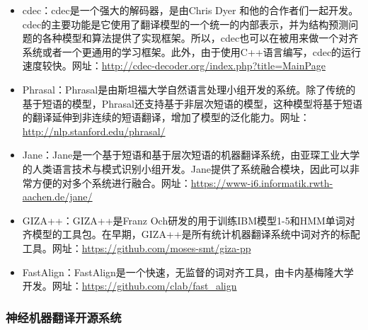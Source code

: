 \begin{itemize}
\vspace{0.5em}
\item cdec：cdec\cite{dyer2010cdec}是一个强大的解码器，是由Chris Dyer 和他的合作者们一起开发。cdec的主要功能是它使用了翻译模型的一个统一的内部表示，并为结构预测问题的各种模型和算法提供了实现框架。所以，cdec也可以在被用来做一个对齐系统或者一个更通用的学习框架。此外，由于使用C++语言编写，cdec的运行速度较快。网址：\url{http://cdec-decoder.org/index.php?title=MainPage}
\vspace{0.5em}
\item Phrasal：Phrasal\cite{Cer2010Phrasal}是由斯坦福大学自然语言处理小组开发的系统。除了传统的基于短语的模型，Phrasal还支持基于非层次短语的模型，这种模型将基于短语的翻译延伸到非连续的短语翻译，增加了模型的泛化能力。网址：\url{http://nlp.stanford.edu/phrasal/}
\vspace{0.5em}
\item Jane：Jane\cite{vilar2012jane}是一个基于短语和基于层次短语的机器翻译系统，由亚琛工业大学的人类语言技术与模式识别小组开发。Jane提供了系统融合模块，因此可以非常方便的对多个系统进行融合。网址：\url{https://www-i6.informatik.rwth-aachen.de/jane/}
\vspace{0.5em}
\item GIZA++：GIZA++\cite{och2003systematic}是Franz Och研发的用于训练IBM模型1-5和HMM单词对齐模型的工具包。在早期，GIZA++是所有统计机器翻译系统中词对齐的标配工具。网址：\url{https://github.com/moses-smt/giza-pp}
\vspace{0.5em}
\item FastAlign：FastAlign\cite{dyer2013a}是一个快速，无监督的词对齐工具，由卡内基梅隆大学开发。网址：\url{https://github.com/clab/fast\_align}
\vspace{0.5em}
\end{itemize}


\subsubsection{神经机器翻译开源系统}

